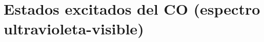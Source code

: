 \documentclass{tufte-book}
\begin{document}
\chapter{Estados excitados del CO (espectro ultravioleta-visible)}



%
%
\end{document}
